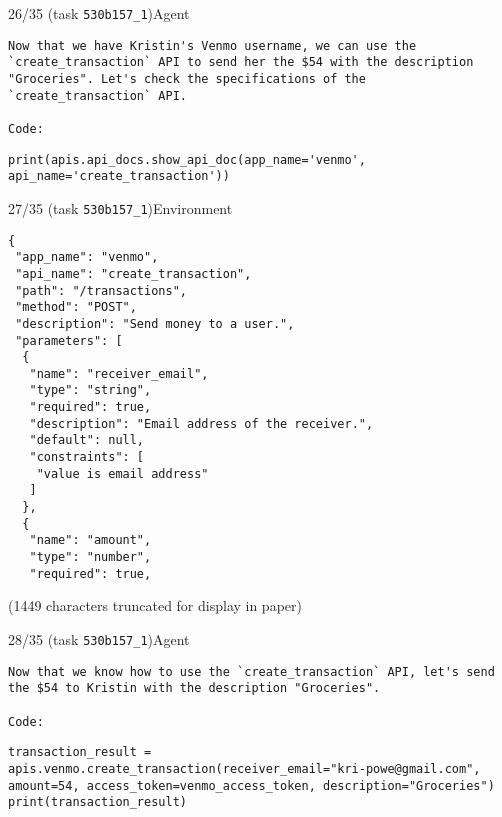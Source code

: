\begin{minipage}{0.95\linewidth}
\begin{assistant_message_box}{{26/35 (task \texttt{530b157\_1})\hfill Agent}}
\scriptsize
\begin{Verbatim}[breaklines]
Now that we have Kristin's Venmo username, we can use the `create_transaction` API to send her the $54 with the description "Groceries". Let's check the specifications of the `create_transaction` API.

Code:
\end{Verbatim}
\begin{tcolorbox}[colback=codebgcolor,boxrule=0pt]\begin{Verbatim}[breaklines]
print(apis.api_docs.show_api_doc(app_name='venmo', api_name='create_transaction'))
\end{Verbatim}
\end{tcolorbox}\end{assistant_message_box}
\end{minipage}

\hspace*{8mm}%
\begin{minipage}{0.95\linewidth}
\begin{user_message_box}{{27/35 (task \texttt{530b157\_1})\hfill Environment}}
\scriptsize
\begin{Verbatim}[breaklines]
{
 "app_name": "venmo",
 "api_name": "create_transaction",
 "path": "/transactions",
 "method": "POST",
 "description": "Send money to a user.",
 "parameters": [
  {
   "name": "receiver_email",
   "type": "string",
   "required": true,
   "description": "Email address of the receiver.",
   "default": null,
   "constraints": [
    "value is email address"
   ]
  },
  {
   "name": "amount",
   "type": "number",
   "required": true,
\end{Verbatim}
(1449 characters truncated for display in paper)\end{user_message_box}
\end{minipage}

\begin{minipage}{0.95\linewidth}
\begin{assistant_message_box}{{28/35 (task \texttt{530b157\_1})\hfill Agent}}
\scriptsize
\begin{Verbatim}[breaklines]
Now that we know how to use the `create_transaction` API, let's send the $54 to Kristin with the description "Groceries".

Code:
\end{Verbatim}
\begin{tcolorbox}[colback=codebgcolor,boxrule=0pt]\begin{Verbatim}[breaklines]
transaction_result = apis.venmo.create_transaction(receiver_email="kri-powe@gmail.com", amount=54, access_token=venmo_access_token, description="Groceries")
print(transaction_result)
\end{Verbatim}
\end{tcolorbox}\end{assistant_message_box}
\end{minipage}

